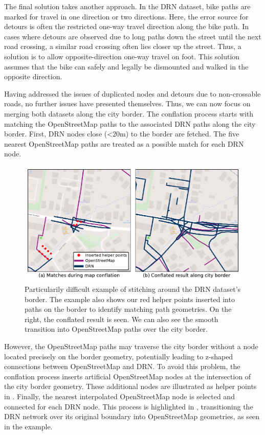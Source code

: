 The final solution takes another approach. In the DRN dataset, bike paths are marked for travel in one direction or two directions. Here, the error source for detours is often the restricted one-way travel direction along the bike path. In cases where detours are observed due to long paths down the street until the next road crossing, a similar road crossing often lies closer up the street. Thus, a solution is to allow opposite-direction one-way travel on foot. This solution assumes that the bike can safely and legally be dismounted and walked in the opposite direction.

Having addressed the issues of duplicated nodes and detours due to non-crossable roads, no further issues have presented themselves. Thus, we can now focus on merging both datasets along the city border. The conflation process starts with matching the OpenStreetMap paths to the associated DRN paths along the city border. First, DRN nodes close (<20m) to the border are fetched. The five nearest OpenStreetMap paths are treated as a possible match for each DRN node. 

\begin{figure}[t]
\centering
\includegraphics[width=\linewidth]{images/routing-drn-osm-border.pdf}
\caption{Particularily difficult example of stitching around the DRN dataset's border. The example also shows our red helper points inserted into paths on the border to identify matching path geometries. On the right, the conflated result is seen. We can also see the smooth transition into OpenStreetMap paths over the city border.}
\label{fig:routing-drn-osm-border}
\end{figure}

However, the OpenStreetMap paths may traverse the city border without a node located precisely on the border geometry, potentially leading to z-shaped connections between OpenStreetMap and DRN. To avoid this problem, the conflation process inserts artificial OpenStreetMap nodes at the intersection of the city border geometry. These additional nodes are illustrated as helper points in . Finally, the nearest interpolated OpenStreetMap node is selected and connected for each DRN node. This process is highlighted in , transitioning the DRN network over its original boundary into OpenStreetMap geometries, as seen in the example.

